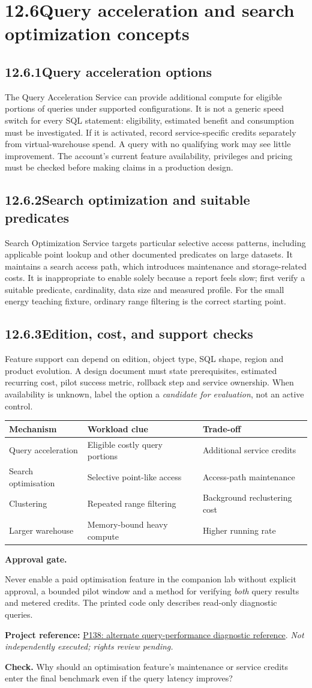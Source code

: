 \documentclass[11pt,twoside]{article}
\newcommand{\topic}[2]{\subsection*{#1\quad #2}}
\newcommand{\repo}[2]{\par\begingroup\fontsize{8.0}{9.6}\selectfont\sffamily\color{inkgray}\textbf{Project reference:} \href{#2}{#1}. \textit{Not independently executed; rights review pending.}\par\endgroup}
\begin{document}
\section*{12.6\quad Query acceleration and search optimization concepts}
\topic{12.6.1}{Query acceleration options}
The Query Acceleration Service can provide additional compute for eligible portions of queries under supported configurations. It is not a generic speed switch for every SQL statement: eligibility, estimated benefit and consumption must be investigated. If it is activated, record service-specific credits separately from virtual-warehouse spend. A query with no qualifying work may see little improvement. The account's current feature availability, privileges and pricing must be checked before making claims in a production design.
\topic{12.6.2}{Search optimization and suitable predicates}
Search Optimization Service targets particular selective access patterns, including applicable point lookup and other documented predicates on large datasets. It maintains a search access path, which introduces maintenance and storage-related costs. It is inappropriate to enable solely because a report feels slow; first verify a suitable predicate, cardinality, data size and measured profile. For the small energy teaching fixture, ordinary range filtering is the correct starting point.
\topic{12.6.3}{Edition, cost, and support checks}
Feature support can depend on edition, object type, SQL shape, region and product evolution. A design document must state prerequisites, estimated recurring cost, pilot success metric, rollback step and service ownership. When availability is unknown, label the option a \emph{candidate for evaluation}, not an active control.
\begin{center}\renewcommand{\arraystretch}{1.08}\begin{tabularx}{\linewidth}{@{}p{31mm}XX@{}}\toprule
\textbf{Mechanism}&\textbf{Workload clue}&\textbf{Trade-off}\\\midrule
Query acceleration&Eligible costly query portions&Additional service credits\\
Search optimisation&Selective point-like access&Access-path maintenance\\
Clustering&Repeated range filtering&Background reclustering cost\\
Larger warehouse&Memory-bound heavy compute&Higher running rate\\\bottomrule\end{tabularx}\end{center}
\begin{whitebox}\textbf{Approval gate.}\par
Never enable a paid optimisation feature in the companion lab without explicit approval, a bounded pilot window and a method for verifying \emph{both} query results and metered credits. The printed code only describes read-only diagnostic queries.\end{whitebox}
\repo{P138: alternate query-performance diagnostic reference}{https://github.com/sfc-gh-hbarile/query_performance_deep_dive}
\textbf{Check.} Why should an optimisation feature's maintenance or service credits enter the final benchmark even if the query latency improves?
\newpage
\end{document}

